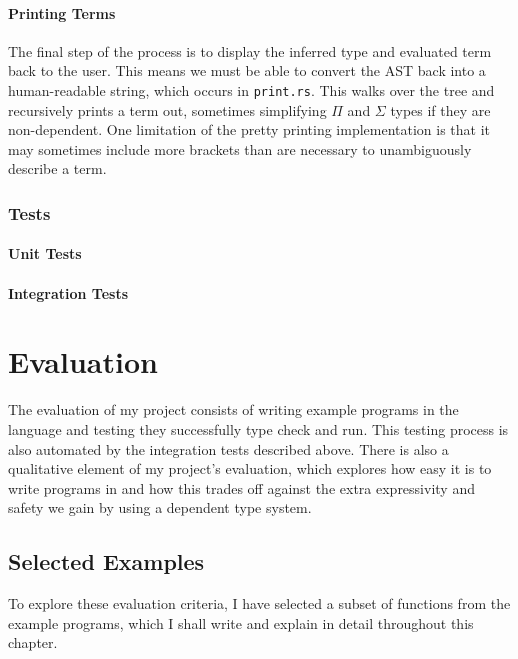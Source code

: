 \documentclass[12pt,a4paper,twoside]{report}
\begin{document}
\subsubsection{Printing Terms}

The final step of the process is to display the inferred type and evaluated term back to the user.
This means we must be able to convert the AST back into a human-readable string, which occurs in \texttt{print.rs}.
This walks over the tree and recursively prints a term out, sometimes simplifying \(\Pi\) and \(\Sigma\) types if they are non-dependent.
One limitation of the pretty printing implementation is that it may sometimes include more brackets than are necessary to unambiguously describe a term.


\subsection{Tests}

\subsubsection{Unit Tests}


\subsubsection{Integration Tests}

\chapter{Evaluation}

The evaluation of my project consists of writing example programs in the \pimu{} language and testing they successfully type check and run.
This testing process is also automated by the integration tests described above.
There is also a qualitative element of my project's evaluation, which explores how easy it is to write programs in \pimu{} and how this trades off against the extra expressivity and safety we gain by using a dependent type system.

\section{Selected Examples}

To explore these evaluation criteria, I have selected a subset of functions from the example programs, which I shall write and explain in detail throughout this chapter.
\end{document}
